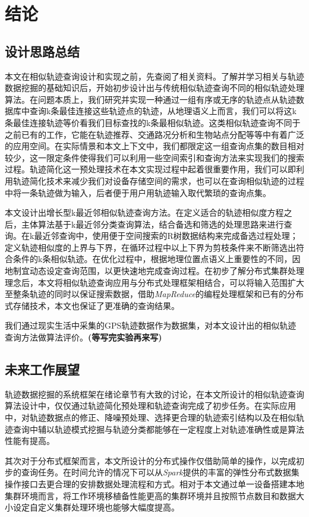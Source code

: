 
\chapter{结论}
\label{chap:conclusion}

\section{设计思路总结}
\label{sec:conclusion implemention}
本文在相似轨迹查询设计和实现之前，先查阅了相关资料。了解并学习相关与轨迹数据挖掘的基础知识后，开始初步设计出与传统相似轨迹查询不同的相似轨迹处理算法。在问题本质上，我们研究并实现一种通过一组有序或无序的轨迹点从轨迹数据库中查询k条最佳连接这些轨迹点的轨迹，从地理语义上而言，我们可以将这k条最佳连接轨迹等价看我们目标查找的k条最相似轨迹。这类相似轨迹查询不同于之前已有的工作，它能在轨迹推荐、交通路况分析和生物站点分配等等中有着广泛的应用空间。在实际情景和本文上下文中，我们都限定这一组查询点集的数目相对较少，这一限定条件使得我们可以利用一些空间索引和查询方法来实现我们的搜索过程。轨迹简化这一预处理技术在本文实现过程中起着很重要作用，我们可以即利用轨迹简化技术来减少我们对设备存储空间的需求，也可以在查询相似轨迹的过程中将一条轨迹做为输入，后者便于用户用轨迹输入取代繁琐的查询点集。

本文设计出增长型k最近邻相似轨迹查询方法。在定义适合的轨迹相似度方程之后，主体算法基于k最近邻分类查询算法，结合备选和筛选的处理思路来进行查询。在k最近邻查询中，使用便于空间搜索的R树数据结构来完成备选过程处理；定义轨迹相似度的上界与下界，在循环过程中以上下界为剪枝条件来不断筛选出符合条件的k条相似轨迹。在优化过程中，根据地理位置点语义上重要性的不同，因地制宜动态设定查询范围，以更快速地完成查询过程。在初步了解分布式集群处理理念后，本文将相似轨迹查询应用与分布式处理框架相结合，可以将输入范围扩大至整条轨迹的同时以保证搜索数据，借助\emph{MapReduce}的编程处理框架和已有的分布式存储技术，本文也保证了更准确的查询结果。

我们通过现实生活中采集的GPS轨迹数据作为数据集，对本文设计出的相似轨迹查询方法做算法评价。\textbf{(等写完实验再来写)}

\section{未来工作展望}
\label{sec:conclusion future}
轨迹数据挖掘的系统框架在绪论章节有大致的讨论，在本文所设计的相似轨迹查询算法设计中，仅仅通过轨迹简化预处理和轨迹查询完成了初步任务。在实际应用中，对轨迹数据点的修正、降噪预处理、选择更合理的轨迹索引结构以及在相似轨迹查询中辅以轨迹模式挖掘与轨迹分类都能够在一定程度上对轨迹准确性或是算法性能有提高。

其次对于分布式框架而言，本文所设计的分布式操作仅借助简单的操作，以完成初步的查询任务。在时间允许的情况下可以从\emph{Spark}提供的丰富的弹性分布式数据集操作接口去更合理的安排数据处理流程和方式。相对于本文通过单一设备搭建本地集群环境而言，将工作环境移植备性能更高的集群环境并且按照节点数目和数据大小设定自定义集群处理环境也能够大幅度提高。


